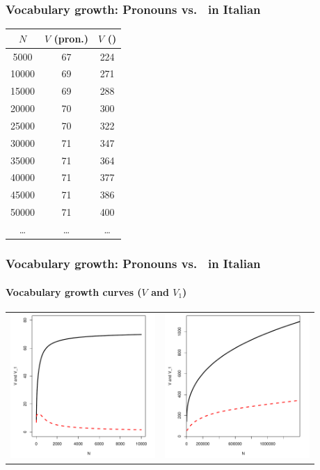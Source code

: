 \documentclass[t]{beamer} %
\begin{document}
\begin{frame}
  \frametitle{Vocabulary growth: Pronouns vs.\ \textcite{ri-} in Italian}

  \begin{center}
    \begin{tabular}{c||c|c}
      $N$ & $V$ (pron.) & $V$ (\textcite{ri-}) \\
      \hline
       \phantom{0}5000 & 67 & 224 \\
       10000 & 69 & 271 \\
       15000 & 69 & 288 \\
       20000 & 70 & 300 \\
       25000 & 70 & 322 \\
       30000 & 71 & 347 \\
       35000 & 71 & 364 \\
       40000 & 71 & 377 \\
       45000 & 71 & 386 \\
       50000 & 71 & 400 \\
       \ldots & \ldots & \ldots
    \end{tabular}
  \end{center}
\end{frame}

\begin{frame}
  \frametitle{Vocabulary growth: Pronouns vs.\ \textcite{ri-} in Italian}
  \framesubtitle{Vocabulary growth curves ($V$ and $V_1$)}

  \hspace{-1cm}%
  \begin{tabular}{cc}
    \includegraphics[height=55mm]{img/pro-sub-bin-vgc} &
    \includegraphics[height=55mm]{img/ita-ri-vgc}
  \end{tabular}
\end{frame}
\end{document}
